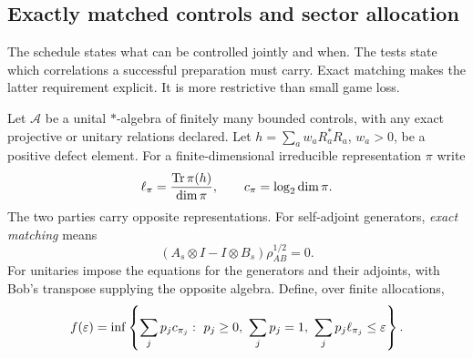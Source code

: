 \subsection{Exactly matched controls and sector allocation}\label{hp:sec:sectors}
The schedule states what can be controlled jointly and when. The tests state which correlations a successful preparation must carry. Exact matching makes the latter requirement explicit. It is more restrictive than small game loss.

Let $\mathcal A$ be a unital $*$-algebra of finitely many bounded controls, with any exact projective or unitary relations declared. Let $h=\sum_aw_aR_a^*R_a$, $w_a>0$, be a positive defect element. For a finite-dimensional irreducible representation $\pi$ write
\[
 \ell_\pi=\frac{\operatorname{Tr}\pi(h)}{\dim\pi},\qquad c_\pi=\log_2\dim\pi.
\]
The two parties carry opposite representations. For self-adjoint generators, \emph{exact matching} means
\begin{equation}
 (A_s\otimes I-I\otimes B_s)\rho_{AB}^{1/2}=0.\label{hp:eq:match}
\end{equation}
For unitaries impose the equations for the generators and their adjoints, with Bob's transpose supplying the opposite algebra. Define, over finite allocations,
\begin{equation}
 f(\eps)=\inf\left\{\sum_jp_jc_{\pi_j}:\ p_j\ge0,\ \sum_jp_j=1,
                       \ \sum_jp_j\ell_{\pi_j}\le\eps\right\}.\label{hp:eq:sectorlp}
\end{equation}

